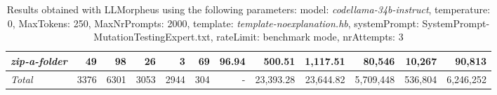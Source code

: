 \begin{table*}
{\begin{tabular}{l||r|r|r|r|r|r||r|r||r|r|r}
   \hline
   \textit{zip-a-folder} & 49 & 98 & 26 & 3 & 69 & 96.94 & 500.51 & 1,117.51 & 80,546 & 10,267 & 90,813 \\ 
   \hline
   \textit{Total} & 3376 & 6301 & 3053 & 2944 & 304 & - & 23,393.28  & 23,644.82 & 5,709,448 & 536,804 & 6,246,252 \\ 
 \end{tabular}
 }
 \caption{Results obtained with LLMorpheus using the following parameters: 
   model: \textit{codellama-34b-instruct}, 
   temperature: 0, 
   MaxTokens: 250, 
   MaxNrPrompts: 2000, 
   template: \textit{template-noexplanation.hb}, 
   systemPrompt: SystemPrompt-MutationTestingExpert.txt, 
   rateLimit: benchmark mode, 
   nrAttempts: 3  
 }
\end{table*}

